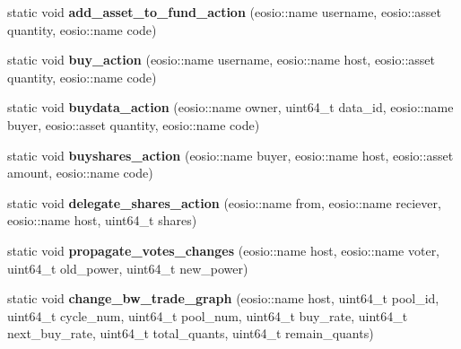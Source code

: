 \begin{DoxyCompactItemize}
\mbox{\label{classeosio_1_1unicore_a2a5163261bb34c4024d44aec09326fb7}} 
static void {\bfseries add\+\_\+asset\+\_\+to\+\_\+fund\+\_\+action} (eosio\+::name username, eosio\+::asset quantity, eosio\+::name code)
\item 
\mbox{\label{classeosio_1_1unicore_a12571e22e870b734efc59efac1a95ac1}} 
static void {\bfseries buy\+\_\+action} (eosio\+::name username, eosio\+::name host, eosio\+::asset quantity, eosio\+::name code)
\item 
\mbox{\label{classeosio_1_1unicore_a060591ff9d973e48f92d4f30a99034b4}} 
static void {\bfseries buydata\+\_\+action} (eosio\+::name owner, uint64\+\_\+t data\+\_\+id, eosio\+::name buyer, eosio\+::asset quantity, eosio\+::name code)
\item 
\mbox{\label{classeosio_1_1unicore_aea60a3392062e7c58d216fc76d32927b}} 
static void {\bfseries buyshares\+\_\+action} (eosio\+::name buyer, eosio\+::name host, eosio\+::asset amount, eosio\+::name code)
\item 
\mbox{\label{classeosio_1_1unicore_aec17bf6a34522987a394263ef9e50ab7}} 
static void {\bfseries delegate\+\_\+shares\+\_\+action} (eosio\+::name from, eosio\+::name reciever, eosio\+::name host, uint64\+\_\+t shares)
\item 
\mbox{\label{classeosio_1_1unicore_adfd8d6d95f1c73db6ac74a7527eb6e90}} 
static void {\bfseries propagate\+\_\+votes\+\_\+changes} (eosio\+::name host, eosio\+::name voter, uint64\+\_\+t old\+\_\+power, uint64\+\_\+t new\+\_\+power)
\item 
\mbox{\label{classeosio_1_1unicore_a2f380b2686c191d1b13aa2e35e599a14}} 
static void {\bfseries change\+\_\+bw\+\_\+trade\+\_\+graph} (eosio\+::name host, uint64\+\_\+t pool\+\_\+id, uint64\+\_\+t cycle\+\_\+num, uint64\+\_\+t pool\+\_\+num, uint64\+\_\+t buy\+\_\+rate, uint64\+\_\+t next\+\_\+buy\+\_\+rate, uint64\+\_\+t total\+\_\+quants, uint64\+\_\+t remain\+\_\+quants)
\item 
\mbox{\label{classeosio_1_1unicore_a7c3f580a80efaea107d8ac65ea934453}} 

\end{DoxyCompactItemize}
